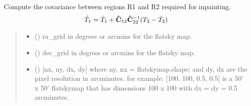 \documentclass[letterpaper,10pt,english]{sphinxmanual}
\begin{document}

\begin{fulllineitems}
\label{\detokenize{inpaint:inpaint.get_covariance}}
\pysigstartsignatures
{}
\pysigstopsignatures
\sphinxAtStartPar
Compute the covariance between regions R1 and R2 required for inpainting.
\begin{equation*}
\begin{split}\hat{T}_{1} = \tilde{T}_{1} + {\bf \hat{C}}_{12}  {\bf \hat{C}}_{22}^{-1} (T_{2} - \tilde{T}_{2})\end{split}
\end{equation*}\begin{quote}\begin{description}
\begin{itemize}
\item {} 
\sphinxAtStartPar
{} () \textendash{} ra\_grid in degrees or arcmins for the flatsky map.

\item {} 
\sphinxAtStartPar
{} () \textendash{} dec\_grid in degress or arcmins for the flatsky map.

\item {} 
\sphinxAtStartPar
{} () \textendash{} {[}nx, ny, dx, dy{]} where ny, nx = flatskymap.shape; and dy, dx are the pixel resolution in arcminutes.
for example: {[}100, 100, 0.5, 0.5{]} is a 50’ x 50’ flatskymap that has dimensions 100 x 100 with dx = dy = 0.5 arcminutes.


\end{itemize}
\end{description}
\end{quote}
\end{fulllineitems}
\end{document}
